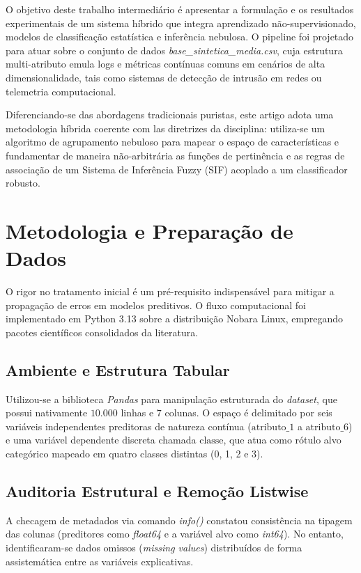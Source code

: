 \documentclass[journal]{IEEEtran}
\begin{document}
O objetivo deste trabalho intermediário é apresentar a formulação e os resultados experimentais de um sistema híbrido que integra aprendizado não-supervisionado, modelos de classificação estatística e inferência nebulosa. O pipeline foi projetado para atuar sobre o conjunto de dados \textit{base\_sintetica\_media.csv}, cuja estrutura multi-atributo emula logs e métricas contínuas comuns em cenários de alta dimensionalidade, tais como sistemas de detecção de intrusão em redes ou telemetria computacional. 

Diferenciando-se das abordagens tradicionais puristas, este artigo adota uma metodologia híbrida coerente com las diretrizes da disciplina: utiliza-se um algoritmo de agrupamento nebuloso para mapear o espaço de características e fundamentar de maneira não-arbitrária as funções de pertinência e as regras de associação de um Sistema de Inferência Fuzzy (SIF) acoplado a um classificador robusto.

\section{Metodologia e Preparação de Dados}
O rigor no tratamento inicial é um pré-requisito indispensável para mitigar a propagação de erros em modelos preditivos. O fluxo computacional foi implementado em Python 3.13 sobre a distribuição Nobara Linux, empregando pacotes científicos consolidados da literatura.

\subsection{Ambiente e Estrutura Tabular}
Utilizou-se a biblioteca \textit{Pandas} para manipulação estruturada do \textit{dataset}, que possui nativamente $10.000$ linhas e $7$ colunas. O espaço é delimitado por seis variáveis independentes preditoras de natureza contínua ($\text{atributo\_1}$ a $\text{atributo\_6}$) e uma variável dependente discreta chamada $\text{classe}$, que atua como rótulo alvo categórico mapeado em quatro classes distintas (0, 1, 2 e 3).

\subsection{Auditoria Estrutural e Remoção Listwise}
A checagem de metadados via comando \textit{info()} constatou consistência na tipagem das colunas (preditores como \textit{float64} e a variável alvo como \textit{int64}). No entanto, identificaram-se dados omissos (\textit{missing values}) distribuídos de forma assistemática entre as variáveis explicativas. 
\end{document}

